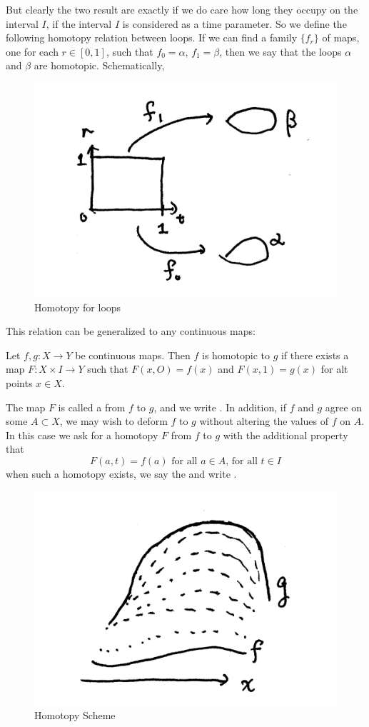 But clearly the two result are exactly if we do care how long they
occupy on the interval $I$, if the interval $I$ is considered as a
time parameter. So we define the following homotopy relation between
loops. If we can find a family $\{f_r\}$ of maps, one for each $r\in
[0,1]$, such that $f_0=\alpha$, $f_1=\beta$, then we say that the
loops $\alpha$ and $\beta$ are homotopic. Schematically,
\begin{figure}[H]
    \centering
    \includegraphics[width=0.6\linewidth]{pics/homotopy-for-loops.pdf}
    \caption{Homotopy for loops}
\end{figure}
This relation can be generalized to any continuous maps:
\begin{defi}[Homotopic]
    Let $f,g: X \to Y$ be continuous maps. Then $f$ is homotopic to
    $g$ if there exists a map $F:X \times I\to Y$ such that $F(x,O) =
    f(x)$ and $F(x,1) = g(x)$ for alt points $x\in X$.
\end{defi}

The map $F$ is called a  from $f$ to $g$, and we write
. In addition, if $f$ and $g$ agree on some
$A\subset X$, we may wish to deform $f$ to $g$ without altering the
values of $f$ on $A$. In this case we ask for a homotopy $F$ from $f$
to $g$ with the additional property that 
\begin{equation}
    F(a,t)=f(a) \text{ for all $a\in A$, for all $t\in I$}
\end{equation}
when such a homotopy exists, we say the  and write .
\begin{figure}[H]
    \centering
    \includegraphics[width=0.5\linewidth]{pics/homotopy-schematic.pdf}
    \caption{Homotopy Scheme}
\end{figure}

